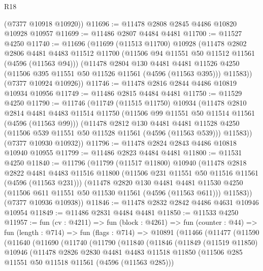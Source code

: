 \begin{lexlean}{R18}
\begin{coremodule}
      (@7377 @10918 @10920))
@11696 := @11478 @2808 @2845 @4486 @10820 @10928 @10957
@11699 := @11486 @2807 @4484 @4481
@11700 := @11527 @4250
@11740 := @11696
    (@11699
      (@11513 @11700)
      @10928
      (@11478
        @2802
        @2806
        @4481
        @4483
        @11512
        @11700
        (@11506 @94 @11551 @50 @11512 @11561 (@4596 (@11563 @94)))
        (@11478
          @2804
          @130
          @4481
          @4481
          @11526
          @4250
          (@11506 @395 @11551 @50 @11526 @11561 (@4596 (@11563 @395)))
          @11583))
      (@7377 @10924 @10926))
@11746 := @11478 @2816 @2844 @4486 @10819 @10934 @10956
@11749 := @11486 @2815 @4484 @4481
@11750 := @11529 @4250
@11790 := @11746
    (@11749
      (@11515 @11750)
      @10934
      (@11478
        @2810
        @2814
        @4481
        @4483
        @11514
        @11750
        (@11506 @99 @11551 @50 @11514 @11561 (@4596 (@11563 @99)))
        (@11478
          @2812
          @130
          @4481
          @4481
          @11528
          @4250
          (@11506 @539 @11551 @50 @11528 @11561 (@4596 (@11563 @539)))
          @11583))
      (@7377 @10930 @10932))
@11796 := @11478 @2824 @2843 @4486 @10818 @10940 @10955
@11799 := @11486 @2823 @4484 @4481
@11800 := @11531 @4250
@11840 := @11796
    (@11799
      (@11517 @11800)
      @10940
      (@11478
        @2818
        @2822
        @4481
        @4483
        @11516
        @11800
        (@11506 @231 @11551 @50 @11516 @11561 (@4596 (@11563 @231)))
        (@11478
          @2820
          @130
          @4481
          @4481
          @11530
          @4250
          (@11506 @611 @11551 @50 @11530 @11561 (@4596 (@11563 @611)))
          @11583))
      (@7377 @10936 @10938))
@11846 := @11478 @2832 @2842 @4486 @4631 @10946 @10954
@11849 := @11486 @2831 @4484 @4481
@11850 := @11533 @4250
@11957 := fun (cv : @4211) =>
  fun (block : @4261) =>
  fun (counter : @44) =>
  fun (length : @714) =>
  fun (flags : @714) =>
  @10891
    (@11466
      (@11477
        (@11590
          (@11640
            (@11690
              (@11740
                (@11790
                  (@11840
                    (@11846
                      (@11849
                        (@11519 @11850)
                        @10946
                        (@11478
                          @2826
                          @2830
                          @4481
                          @4483
                          @11518
                          @11850
                          (@11506 @285 @11551 @50 @11518 @11561 (@4596 (@11563 @285)))

\end{coremodule}
\end{lexlean}
